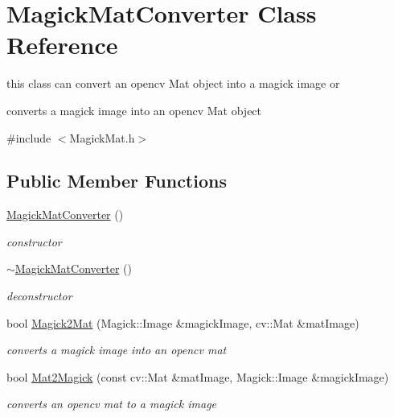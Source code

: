 \hypertarget{classMagickMatConverter}{
\section{MagickMatConverter Class Reference}
\label{classMagickMatConverter}
}


this class can convert an opencv Mat object into a magick image or \par
 converts a magick image into an opencv Mat object  




{\ttfamily \#include $<$MagickMat.h$>$}

\subsection*{Public Member Functions}
\begin{DoxyCompactItemize}
\item 
\hypertarget{classMagickMatConverter_ae7141cb928ad84892bdf0553207fa761}{
\hyperlink{classMagickMatConverter_ae7141cb928ad84892bdf0553207fa761}{MagickMatConverter} ()}
\label{classMagickMatConverter_ae7141cb928ad84892bdf0553207fa761}

\begin{DoxyCompactList}\small\item\em constructor \item\end{DoxyCompactList}\item 
\hypertarget{classMagickMatConverter_a75d2e12483b847337d9475cd56c62af7}{
\hyperlink{classMagickMatConverter_a75d2e12483b847337d9475cd56c62af7}{$\sim$MagickMatConverter} ()}
\label{classMagickMatConverter_a75d2e12483b847337d9475cd56c62af7}

\begin{DoxyCompactList}\small\item\em deconstructor \item\end{DoxyCompactList}\item 
bool \hyperlink{classMagickMatConverter_aceddd38e54bd8008ba76cdb80fa8ef92}{Magick2Mat} (Magick::Image \&magickImage, cv::Mat \&matImage)
\begin{DoxyCompactList}\small\item\em converts a magick image into an opencv mat \item\end{DoxyCompactList}\item 
bool \hyperlink{classMagickMatConverter_a9b2c6a781862bc884e890488e8eb2e48}{Mat2Magick} (const cv::Mat \&matImage, Magick::Image \&magickImage)
\begin{DoxyCompactList}\small\item\em converts an opencv mat to a magick image \item\end{DoxyCompactList}\end{DoxyCompactItemize}


